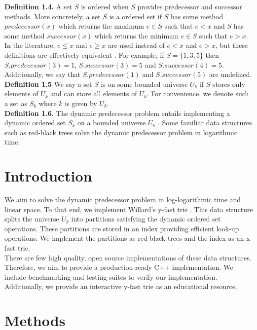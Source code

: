 \documentclass{article}
\begin{document}
\noindent
\textbf{Definition 1.4.} A set $S$ is ordered when $S$ provides predecessor and successor methods. More concretely, a set $S$ is a ordered set if $S$ has some method $predecessor(x)$ which returns the maximum $e \in S$ such that $e < x$ and $S$ has some method $successor(x)$ which returns the minimum $e \in S$ such that $e > x$. In the literature, $e \leq x$ and $e \geq x$ are used instead of $e < x$ and $e > x$, but these definitions are effectively equivalent \cite{10.1145/3409371}. For example, if $S = \{1, 3, 5\}$ then $S.predecessor(3) = 1$, $S.successor(3) = 5$ and $S.successor(4) = 5$. Additionally, we say that $S.predecessor(1)$ and $S.successor(5)$ are undefined.
\\

\noindent
\textbf{Definition 1.5} We say a set $S$ is on some bounded universe $U_k$ if $S$ stores only elements of $U_k$ and can store all elements of $U_k$. For convenience, we denote such a set as $S_k$ where $k$ is given by $U_k$. 
\\

\noindent
\textbf{Definition 1.6.} The dynamic predecessor problem entails implementing a dynamic ordered set $S_k$ on a bounded universe $U_k$ \cite{10.1145/3409371}. Some familiar data structures such as red-black trees solve the dynamic predecessor problem in logarithmic time. 

\section{Introduction}

\noindent
We aim to solve the dynamic predecessor problem in log-logarithmic time and linear space. To that end, we implement Willard's y-fast trie \cite{WILLARD198381}. This data structure splits the universe $U_k$ into partitions satisfying the dynamic ordered set operations. These partitions are stored in an index providing efficient look-up operations. We implement the partitions as red-black trees and the index as an x-fast trie. 
\\

\noindent
There are few high quality, open source implementations of these data structures. Therefore, we aim to provide a production-ready C++ implementation. We include benchmarking and testing suites to verify our implementation. Additionally, we provide an interactive y-fast trie as an educational resource.
\\

\section{Methods}
\end{document}
